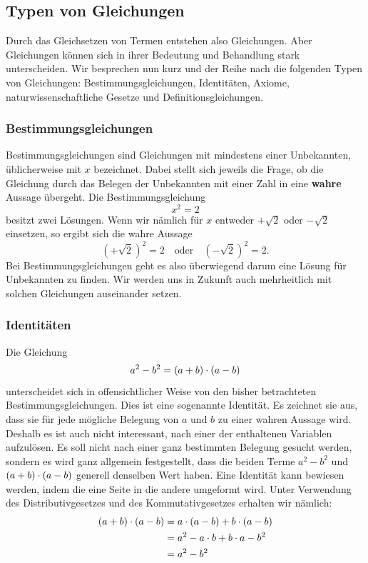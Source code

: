 \documentclass[11pt,oneside]{article}
\begin{document}
\subsection{Typen von Gleichungen}
	Durch das Gleichsetzen von Termen entstehen also Gleichungen. Aber Gleichungen können sich in ihrer Bedeutung und Behandlung stark unterscheiden. Wir besprechen nun kurz und der Reihe nach die folgenden Typen von Gleichungen: Bestimmungsgleichungen, Identitäten, Axiome, naturwissenschaftliche Gesetze und Definitionsgleichungen.
	\subsubsection*{Bestimmungsgleichungen}
		Bestimmungsgleichungen sind Gleichungen mit mindestens einer Unbekannten, üblicherweise mit $x$ bezeichnet. Dabei stellt sich jeweils die Frage, ob die Gleichung durch das Belegen der Unbekannten mit einer Zahl in eine \textbf{wahre} Aussage übergeht.\newline
		Die Bestimmungsgleichung \[x^2=2\] besitzt zwei Lösungen. Wenn wir nämlich für $x$ entweder $+\sqrt{2}$ oder $-\sqrt{2}$ einsetzen, so ergibt sich die wahre Aussage \[\left(+\sqrt{2}\right)^2=2\quad\text{oder}\quad\left(-\sqrt{2}\right)^2=2.\]
		Bei Bestimmungsgleichungen geht es also überwiegend darum eine Lösung für Unbekannten zu finden. Wir werden uns in Zukunft auch mehrheitlich mit solchen Gleichungen auseinander setzen.

	\subsubsection*{Identitäten}
		Die Gleichung \[a^2-b^2=(a+b)\cdot(a-b)\] unterscheidet sich in offensichtlicher Weise von den bisher betrachteten Bestimmungsgleichungen. Dies ist eine sogenannte Identität. Es zeichnet sie aus, dass sie für jede mögliche Belegung von $a$ und $b$ zu einer wahren Aussage wird. Deshalb es ist auch nicht interessant, nach einer der enthaltenen Variablen aufzulösen. Es soll nicht nach einer ganz bestimmten Belegung gesucht werden, sondern es wird ganz allgemein festgestellt, dass die beiden Terme $a^2-b^2$ und $(a+b)\cdot(a-b)$ generell denselben Wert haben.\newline
		Eine Identität kann bewiesen werden, indem die eine Seite in die andere umgeformt wird. Unter Verwendung des Distributivgesetzes und des Kommutativgesetzes erhalten wir nämlich:
		\begin{align*}
			(a+b)\cdot(a-b) &= a\cdot(a-b)+b\cdot(a-b)\\
			&= a^2-a\cdot b+b\cdot a-b^2\\
			&= a^2-b^2
		\end{align*}
\end{document}

